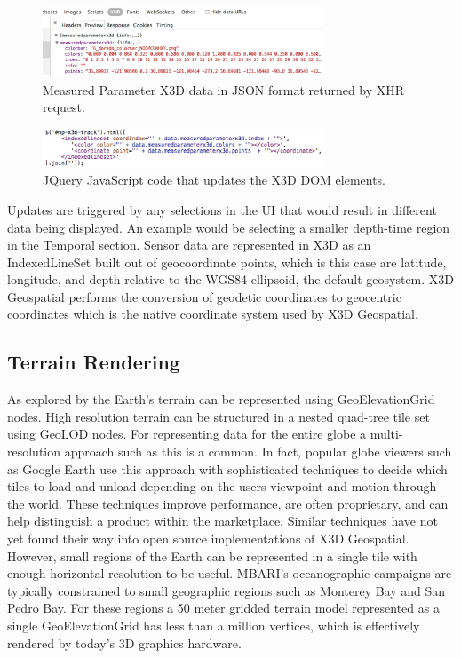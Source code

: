 \documentclass[conference]{IEEEtran}
\begin{document}
\begin{figure}[!htbp]
\centering
\includegraphics[width=3.3in]{JSONData.png}
\caption{Measured Parameter X3D data in JSON format returned by XHR request.}
\label{fig:JSONData}
\end{figure}

\begin{figure}[!htbp]
\centering
\includegraphics[width=3.3in]{jQueryDOMUpdate.png}
\caption{JQuery JavaScript code that updates the X3D DOM elements.}
\label{fig:jQueryDOMUpdate}
\end{figure}

Updates are triggered by any selections in the UI that would result in different data being displayed. An example would be selecting a smaller depth-time region in the Temporal section. Sensor data are represented in X3D as an IndexedLineSet built out of geocoordinate points, which is this case are latitude, longitude, and depth relative to the WGS84 ellipsoid, the default geosystem. X3D Geospatial performs the conversion of geodetic coordinates to geocentric coordinates which is the native coordinate system used by X3D Geospatial.

\subsection{Terrain Rendering}

As explored by \cite{yoo09} the Earth's terrain can be represented using GeoElevationGrid nodes. High resolution terrain can be structured in a nested quad-tree tile set using GeoLOD nodes. For representing data for the entire globe a multi-resolution approach such as this is a common. In fact, popular globe viewers such as Google Earth use this approach with sophisticated techniques to decide which tiles to load and unload depending on the users viewpoint and motion through the world. These techniques improve performance, are often proprietary, and can help distinguish a product within the marketplace. Similar techniques have not yet found their way into open source implementations of X3D Geospatial. However, small regions of the Earth can be represented in a single tile with enough horizontal resolution to be useful. MBARI's oceanographic campaigns are typically constrained to small geographic regions such as Monterey Bay and San Pedro Bay. For these regions a 50 meter gridded terrain model represented as a single GeoElevationGrid has less than a million vertices, which is effectively  rendered by today's 3D graphics hardware.
\end{document}
